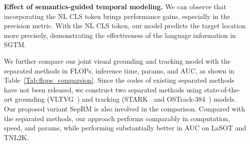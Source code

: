 \noindent\textbf{Effect of semantics-guided temporal modeling.}
We can observe that incorporating the NL CLS token brings performance gains, especially in the precision metric.
With the NL CLS token, our model predicts the target location more precisely, demonstrating the effectiveness of the language information in SGTM.

We further compare our joint visual grounding and tracking model with the separated methods in FLOPs, inference time, params, and AUC, as shown in Table~\ref{Tab:flops_comparsion}. Since the codes of existing separated methods have not been released, we construct two separated methods using state-of-the-art grounding (VLTVG~\cite{VLTVG}) and tracking (STARK~\cite{stark} and OSTrack-384~\cite{ostrack}) models.
Our proposed variant SepRM is also involved in the comparison. Compared with the separated methods, our approach performs comparably in computation, speed, and params, while performing substantially better in AUC on LaSOT and TNL2K.

